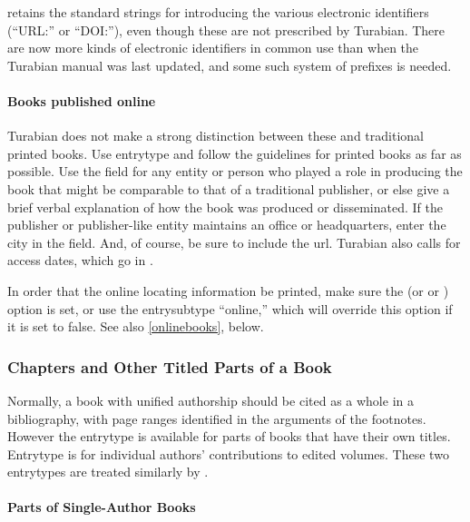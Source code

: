 \documentclass{ltxdockit}[2010/02/12]
\begin{document}
 retains the standard  strings for introducing the various electronic identifiers (\eg ``URL:'' or ``DOI:''), even though these are not prescribed by Turabian. There are now more kinds of electronic identifiers in common use than when the Turabian manual was last updated, and some such system of prefixes is needed.

\paragraph{Books published online}\label{booksonline}
Turabian does not make a strong distinction between these and traditional printed books. Use entrytype  and follow the guidelines for printed books as far as possible. Use the  field for any entity or person who played a role in producing the book that might be  comparable to that of a traditional publisher, or else give a brief verbal explanation of how the book was produced or disseminated. If the publisher or publisher-like entity maintains an office or headquarters, enter the city in the  field. And, of course, be sure to include the url. Turabian also calls for access dates, which go in .

In order that the online locating information be printed, make sure the  (or  or ) option is set, or use the entrysubtype ``online,'' which will override this option if it is set to false.\autocites{lamarck1999zoological-phil}
See also \ref{onlinebooks}, below.



\subsubsection{Chapters and Other Titled Parts of a Book}
Normally, a book with unified authorship should be cited as a whole in a bibliography, with page ranges identified in the  arguments of the footnotes. However the entrytype  is available for parts of books that have their own titles. Entrytype  is for individual authors' contributions to edited volumes. These two entrytypes are treated similarly by .

\paragraph{Parts of Single-Author Books}
\end{document}

